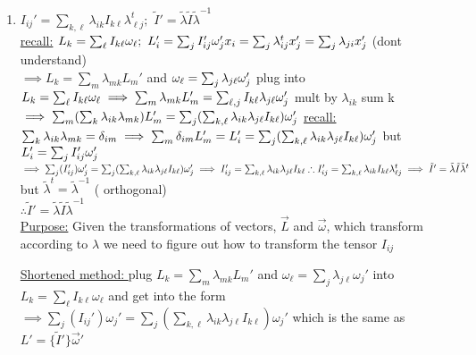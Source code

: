 \documentclass[12pt]{amsart}
\begin{document}
\begin{enumerate}
\item \underline{$I_{ij}'=\sum_{k,\ell} \lambda_{ik} I_{k \ell} \lambda_{\ell j}^t;\,\, \tilde{I}'=\tilde{\lambda} \tilde{I} \tilde{\lambda}^{-1}$}\\
\underline{recall:} $L_k = \sum_{\ell} I_{k \ell} \omega_{\ell} ;\,\, L_i'=\sum_j I_{ij}' \omega_j'\\
x_i=\sum_j \lambda_{ij}^t x_j'=\sum_{j} \lambda_{ji} x_j'$ (dont understand)\\
$\implies L_k = \sum_m \lambda_{mk} L_m'$ and $\omega_{\ell} = \sum_j \lambda_{j \ell} \omega_j'\\$
plug into $L_k = \sum_{\ell} I_{k \ell} \omega_{\ell}\\
\implies \sum_m \lambda_{mk} L_m'=\sum_{\ell,j} I_{k \ell} \lambda_{j \ell} \omega_j'$ mult by $ \lambda_{ik}$ sum k\\
$\implies \sum_m(\sum_k \lambda_{ik} \lambda_{mk}) L_m'=\sum_j ( \sum_{k,\ell} \lambda_{ik} \lambda_{j \ell} I_{k \ell} ) \omega_j'\\$
\underline{recall:} $\sum_k \lambda_{ik} \lambda_{mk} = \delta_{im}\\
\implies \sum_m \delta_{im} L_m'=L_i'=\sum_j(\sum_{k, \ell} \lambda_{ik} \lambda_{j \ell} I_{k \ell}) \omega_j'\\$
but $L_i'=\sum_j I_{ij}' \omega_j'\\$
$\implies \sum_j ( I_{ij}') \omega_j'= \sum_j( \sum_{k, \ell} \lambda_{ik} \lambda_{j \ell} I_{k \ell}) \omega_j'\\
\implies I_{ij}'=\sum_{k, \ell} \lambda_{ik} \lambda_{j \ell} I_{k \ell} \\
\therefore I_{ij}'=\sum_{k, \ell} \lambda_{ik} I_{k \ell} \lambda_{\ell j}^t \implies \tilde{I}'=\tilde{\lambda} \tilde{I} \tilde{\lambda}^t\\$
but $\tilde{\lambda}^t = \tilde{\lambda}^{-1}$ ( orthogonal)\\
$\therefore \tilde{I}'=\tilde{\lambda} \tilde{I} \tilde{\lambda}^{-1}$\\

\underline{Purpose:} Given the transformations of vectors, $\vec{L}$ and $\vec{\omega}$, which transform according to $\lambda$ we need to figure out how to transform the tensor $I_{ij}$

\underline{Shortened method: } plug $L_k = \sum_m \lambda_{mk} L_m'$ and $\omega_{\ell} = \sum_j \lambda_{j \ell} \omega_j'$ into $L_k = \sum_{\ell} I_{k \ell} \omega_{\ell}$ and get into the form $\implies \sum_j ( I_{ij}') \omega_j'= \sum_j( \sum_{k, \ell} \lambda_{ik} \lambda_{j \ell} I_{k \ell}) \omega_j'$ which is the same as $L'= \{\tilde{I}'\} \vec{\omega}'$



\end{enumerate}
\end{document}
